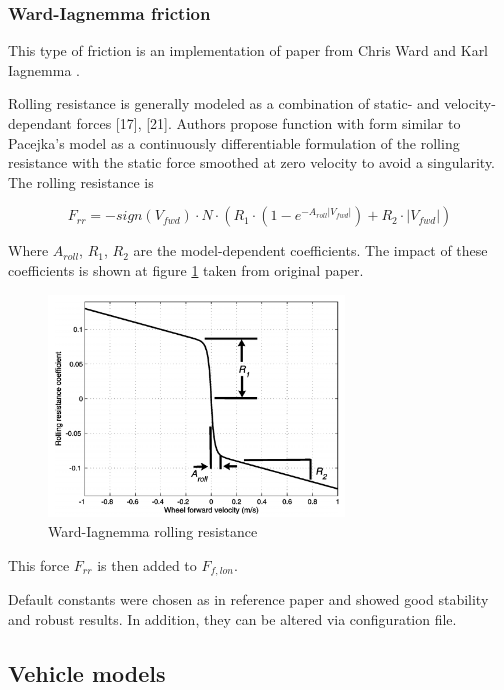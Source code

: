 \documentclass[a4paper,11pt]{article}
\begin{document}
\newpage
\subsubsection{Ward-Iagnemma friction}\label{sec:wi_friction}
This type of friction is an implementation of paper from Chris Ward and Karl Iagnemma \cite{ward-iagnemma-friction}.

Rolling resistance is generally modeled as a combination of
static- and velocity-dependant forces [17], [21]. Authors propose function with form similar to Pacejka's model \cite{pacejka_tire_model} as a continuously differentiable
formulation of the rolling resistance with the static force
smoothed at zero velocity to avoid a singularity. The rolling
resistance is


$$
F_{rr} = −sign(V_{fwd}) \cdot N \cdot (R_1 \cdot (1 − e^{−A_{roll} |V_{fwd} |}
)+R_2 \cdot |V_{fwd}|)
$$


Where $A_{roll}$, $R_1$, $R_2$ are the model-dependent coefficients. The impact of these coefficients is shown at figure \ref{fig:wi_rr} taken from original paper.

\begin{figure}[h!]
	\centerline{\includegraphics[width = 0.7\textwidth]{imgs/wi_rr}}	
	\caption{Ward-Iagnemma rolling resistance}
	\label{fig:wi_rr}
\end{figure}

This force $F_{rr}$ is then added to $F_{f,lon}$.

Default constants were chosen as in reference paper and showed good stability and robust results. In addition, they can be altered via configuration file. 



\newpage


\subsection{Vehicle models} \label{vehicle_models}
\end{document}
